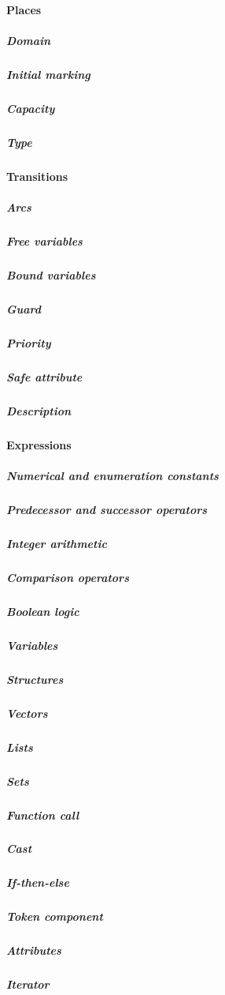 \paragraph{Places\\}\placedef
\subparagraph{Domain\\}\placedomaindef
\subparagraph{Initial marking\\}\initialmarkingdef
\subparagraph{Capacity\\}\capacitydef
\subparagraph{Type\\}\placetypedef

\paragraph{Transitions\\}\transitiondef
\subparagraph{Arcs\\}\arcdef
\subparagraph{Free variables\\}\freevariablesdef
\subparagraph{Bound variables\\}\boundvariablesdef
\subparagraph{Guard\\}\guarddef
\subparagraph{Priority\\}\prioritydef
\subparagraph{Safe attribute\\}\safedef
\subparagraph{Description\\}\descriptiondef

\paragraph{Expressions\\}\expressiondef
\subparagraph{Numerical and enumeration constants\\}\constantexpressiondef
\subparagraph{Predecessor and successor operators\\}\predsuccoperationdef
\subparagraph{Integer arithmetic\\}\integeroperationdef
\subparagraph{Comparison operators\\}\comparisonoperationdef
\subparagraph{Boolean logic\\}\booleanoperationdef
\subparagraph{Variables\\}\variabledef
\subparagraph{Structures\\}\structuredef
\subparagraph{Vectors\\}\vectordef
\subparagraph{Lists\\}\listdef
\subparagraph{Sets\\}\setdef
\subparagraph{Function call\\}\functioncalldef
\subparagraph{Cast\\}\castdef
\subparagraph{If-then-else\\}\ifthenelsedef
\subparagraph{Token component\\}\tokencomponentdef
\subparagraph{Attributes\\}\attributedef
\subparagraph{Iterator\\}\iteratordef

